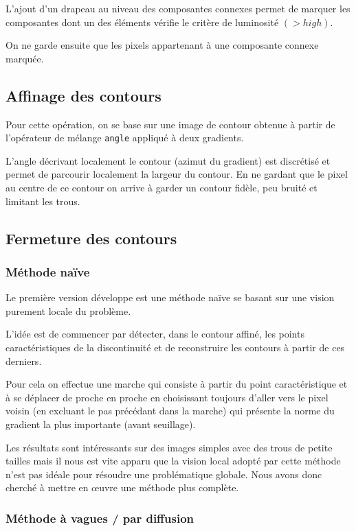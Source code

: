 L'ajout d'un drapeau au niveau des composantes connexes permet de marquer les composantes dont un des éléments vérifie le critère de luminosité $(>high)$.

On ne garde ensuite que les pixels appartenant à une composante connexe marquée.

\subsection{Affinage des contours}
Pour cette opération, on se base sur une image de contour obtenue à partir de l'opérateur de mélange \texttt{angle} appliqué à deux gradients.

L'angle décrivant localement le contour (azimut du gradient) est discrétisé et permet de parcourir localement la largeur du contour. En ne gardant que le pixel au centre de ce contour on arrive à garder un contour fidèle, peu bruité et limitant les trous.


\subsection{Fermeture des contours}
\subsubsection{Méthode naïve}

Le première version développe est une méthode naïve se basant sur une vision purement locale du problème.

L'idée est de commencer par détecter, dans le contour affiné, les points caractéristiques de la discontinuité et de reconstruire les contours à partir de ces derniers.

Pour cela on effectue une marche qui consiste à partir du point caractéristique et à se déplacer de proche en proche en choisissant toujours d'aller vers le pixel voisin (en excluant le pas précédant dans la marche) qui présente la norme du gradient la plus importante (avant seuillage).

Les résultats sont intéressants sur des images simples avec des trous de petite tailles mais il nous est vite apparu que la vision local adopté par cette méthode n'est pas idéale pour résoudre une problématique globale. Nous avons donc cherché à mettre en œuvre une méthode plus complète.


\subsubsection{Méthode à vagues / par diffusion}

